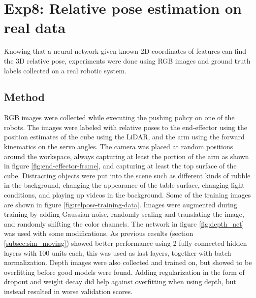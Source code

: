 \chapter{Exp8: Relative pose estimation on real data}

Knowing that a neural network given known 2D coordinates of features can find
the 3D relative pose, experiments were done using RGB images and ground truth
labels collected on a real robotic system.

\section{Method}

RGB images were collected while executing the pushing policy on one of the
robots. The images were labeled with relative poses to the end-effector using
the position estimates of the cube using the LiDAR, and the arm using the
forward kinematics on the servo angles. The camera was placed at random
positions around the workspace, always capturing at least the portion of the
arm as shown in figure \ref{fig:end-effector-frame}, and capturing at least the
top surface of the cube. Distracting objects were put into the scene such as
different kinds of rubble in the background, changing the appearance of the
table surface, changing light conditions, and playing up videos in the
background. Some of the training images are shown in figure
\ref{fig:relpose-training-data}. Images were augmented during training by
adding Gaussian noise, randomly scaling and translating the image, and randomly
shifting the color channels. The network in figure \ref{fig:depth_net} was used
with some modifications. As previous results (section \ref{subsec:sim_moving})
showed better performance using 2 fully connected hidden layers with 100 units
each, this was used as last layers, together with batch normalization. Depth
images were also collected and trained on, but showed to be overfitting before
good models were found. Adding regularization in the form of dropout and weight
decay did help against overfitting when using depth, but instead resulted in
worse validation scores.

